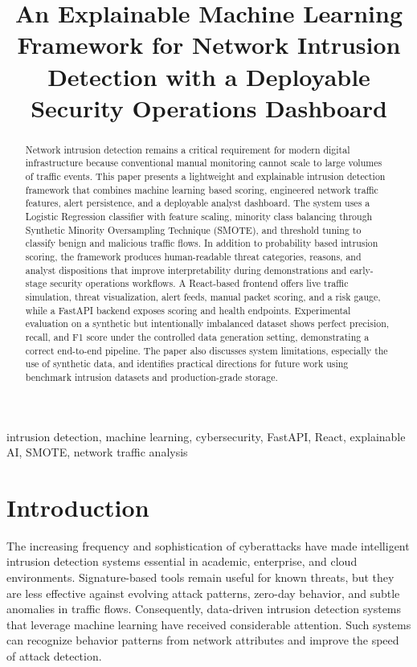 \documentclass[conference]{IEEEtran}
\title{An Explainable Machine Learning Framework for Network Intrusion Detection with a Deployable Security Operations Dashboard}
\author{
\IEEEauthorblockN{
Eshaan Sharma,
Kanav Kaul,
Akshveer Singh Lamba,
Aditya Singh,
Krishna Mehra
}
\IEEEauthorblockA{
Department of Computer Science and Engineering (Artificial Intelligence and Machine Learning)\\
Apex Institute of Technology, Chandigarh University, Mohali, India
}
}
\begin{document}
\maketitle

\begin{abstract}
Network intrusion detection remains a critical requirement for modern digital infrastructure because conventional manual monitoring cannot scale to large volumes of traffic events. This paper presents a lightweight and explainable intrusion detection framework that combines machine learning based scoring, engineered network traffic features, alert persistence, and a deployable analyst dashboard. The system uses a Logistic Regression classifier with feature scaling, minority class balancing through Synthetic Minority Oversampling Technique (SMOTE), and threshold tuning to classify benign and malicious traffic flows. In addition to probability based intrusion scoring, the framework produces human-readable threat categories, reasons, and analyst dispositions that improve interpretability during demonstrations and early-stage security operations workflows. A React-based frontend offers live traffic simulation, threat visualization, alert feeds, manual packet scoring, and a risk gauge, while a FastAPI backend exposes scoring and health endpoints. Experimental evaluation on a synthetic but intentionally imbalanced dataset shows perfect precision, recall, and F1 score under the controlled data generation setting, demonstrating a correct end-to-end pipeline. The paper also discusses system limitations, especially the use of synthetic data, and identifies practical directions for future work using benchmark intrusion datasets and production-grade storage.
\end{abstract}

\begin{IEEEkeywords}
intrusion detection, machine learning, cybersecurity, FastAPI, React, explainable AI, SMOTE, network traffic analysis
\end{IEEEkeywords}

\section{Introduction}
The increasing frequency and sophistication of cyberattacks have made intelligent intrusion detection systems essential in academic, enterprise, and cloud environments. Signature-based tools remain useful for known threats, but they are less effective against evolving attack patterns, zero-day behavior, and subtle anomalies in traffic flows. Consequently, data-driven intrusion detection systems that leverage machine learning have received considerable attention. Such systems can recognize behavior patterns from network attributes and improve the speed of attack detection.
\end{document}

